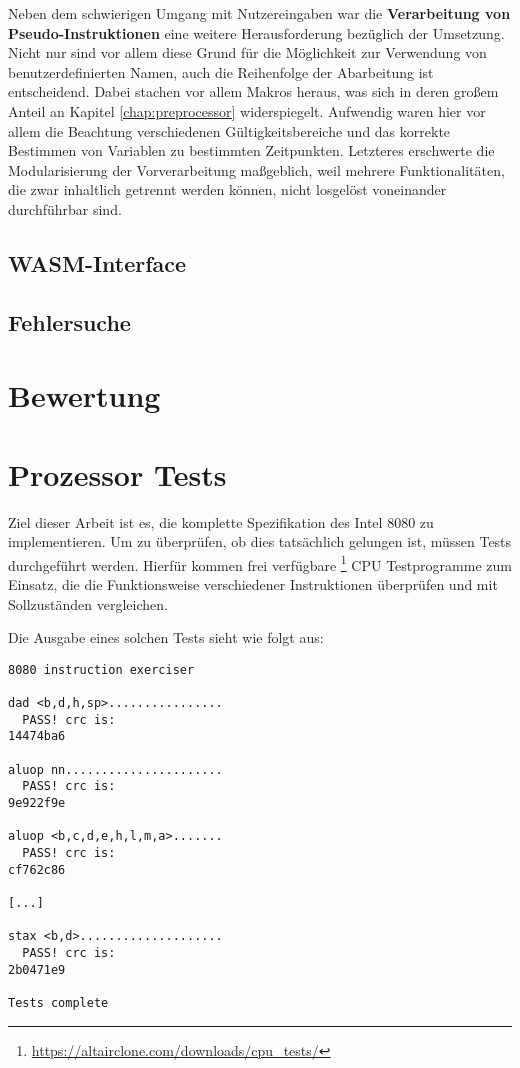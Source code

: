 Neben dem schwierigen Umgang mit Nutzereingaben war die \textbf{Verarbeitung von Pseudo-Instruktionen} eine weitere Herausforderung bezüglich der Umsetzung. Nicht nur sind vor allem diese Grund für die Möglichkeit zur Verwendung von benutzerdefinierten Namen, auch die Reihenfolge der Abarbeitung ist entscheidend. Dabei stachen vor allem Makros heraus, was sich in deren großem Anteil an Kapitel \ref{chap:preprocessor} widerspiegelt. Aufwendig waren hier vor allem die Beachtung verschiedenen Gültigkeitsbereiche und das korrekte Bestimmen von Variablen zu bestimmten Zeitpunkten. Letzteres erschwerte die Modularisierung der Vorverarbeitung maßgeblich, weil mehrere Funktionalitäten, die zwar inhaltlich getrennt werden können, nicht losgelöst voneinander durchführbar sind.

\subsection{\ac{WASM}-Interface}



\subsection{Fehlersuche}\label{sec:errors}



\section{Bewertung}


\section{Prozessor Tests}\label{sec:tests}

Ziel dieser Arbeit ist es, die komplette Spezifikation des Intel 8080 zu implementieren. Um zu überprüfen, ob dies tatsächlich gelungen ist, müssen Tests durchgeführt werden. Hierfür kommen frei verfügbare \footnote[1]{\url{https://altairclone.com/downloads/cpu_tests/}} CPU Testprogramme zum Einsatz, die die Funktionsweise verschiedener Instruktionen überprüfen und mit Sollzuständen vergleichen.

Die Ausgabe eines solchen Tests sieht wie folgt aus:

\begin{verbatim}
8080 instruction exerciser

dad <b,d,h,sp>................
  PASS! crc is:
14474ba6

aluop nn......................
  PASS! crc is:
9e922f9e

aluop <b,c,d,e,h,l,m,a>.......
  PASS! crc is:
cf762c86

[...]

stax <b,d>....................
  PASS! crc is:
2b0471e9

Tests complete
\end{verbatim}

